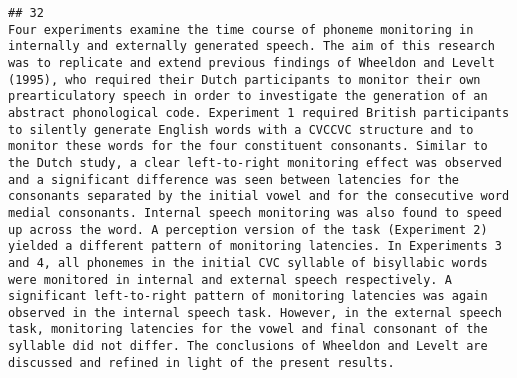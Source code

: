 \documentclass[
  english,
  man]{apa6}
\begin{document}
\begin{verbatim}
## 32                                                                                                                                                                                                                                                                                                                                                                                                                                                                                                                                                                                                                                                                                                                                                                                                                                                                                                                                                                                                                                                                                                                                                                                                  Four experiments examine the time course of phoneme monitoring in internally and externally generated speech. The aim of this research was to replicate and extend previous findings of Wheeldon and Levelt (1995), who required their Dutch participants to monitor their own prearticulatory speech in order to investigate the generation of an abstract phonological code. Experiment 1 required British participants to silently generate English words with a CVCCVC structure and to monitor these words for the four constituent consonants. Similar to the Dutch study, a clear left-to-right monitoring effect was observed and a significant difference was seen between latencies for the consonants separated by the initial vowel and for the consecutive word medial consonants. Internal speech monitoring was also found to speed up across the word. A perception version of the task (Experiment 2) yielded a different pattern of monitoring latencies. In Experiments 3 and 4, all phonemes in the initial CVC syllable of bisyllabic words were monitored in internal and external speech respectively. A significant left-to-right pattern of monitoring latencies was again observed in the internal speech task. However, in the external speech task, monitoring latencies for the vowel and final consonant of the syllable did not differ. The conclusions of Wheeldon and Levelt are discussed and refined in light of the present results.

\end{verbatim}
\end{document}
